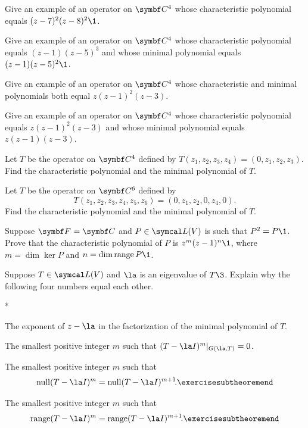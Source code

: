 \begin{exercises}
\exercise
Give an example of an operator on $\C{4}$ whose characteristic
polynomial equals $(z - 7)^2 (z - 8)^2\1$.


\exercise
Give an example of an operator on $\C4$ whose characteristic
polynomial equals $(z - 1) (z - 5)^3$ and whose minimal polynomial equals
$(z - 1) (z - 5)^2\1$.


\exercise
Give an example of an operator on $\C{4}$ whose characteristic and
minimal polynomials both equal $z (z - 1)^2 (z - 3)$.


\exercise
Give an example of an operator on $\C{4}$ whose characteristic
polynomial equals $z (z - 1)^2 (z - 3)$ and whose minimal polynomial equals
$z (z - 1) (z - 3)$.

\exercise
Let $T$ be the operator on $\C4$ defined by
$
T(z_1, z_2, z_3, z_4) = (0, z_1, z_2, z_3)$.
Find the characteristic polynomial and the minimal polynomial of $T$.


\exercise
Let $T$ be the operator on $\C6$ defined by
\[
T(z_1, z_2, z_3, z_4, z_5, z_6) = (0, z_1, z_2, 0, z_4, 0).
\]
Find the characteristic polynomial and the minimal polynomial of $T$.


\exercise
Suppose $\F{} = \C{}$ and $P \in \L(V)$ is such that $P^2 = P\1$. Prove that the characteristic polynomial of $P$ is $z^m (z-1)^n\1$, where $m = \dim \ker P$ and $n = \dim \ran P\1$.\label{8P2}


\exercise
Suppose $T \in \L(V)$ and $\la$ is an eigenvalue of $T\3$. Explain why the following four numbers equal each other.
\begin{subtheorem}*
\item
The exponent of $z-\la$ in the factorization of the minimal polynomial of $T$.
\item
The smallest positive integer $m$ such that $(T - \la I)^m|_{G(\la, T)} = 0$.
\item
The smallest positive integer $m$ such that
\[
\ker (T - \la I)^m = \ker (T - \la I)^{m+1}\!.
\exercisesubtheoremend
\]
\item
The smallest positive integer $m$ such that
\[
\ran (T - \la I)^m = \ran (T - \la I)^{m+1}\!.
\exercisesubtheoremend
\]
\end{subtheorem}
\exercisesubtheoremend



\end{exercises}
